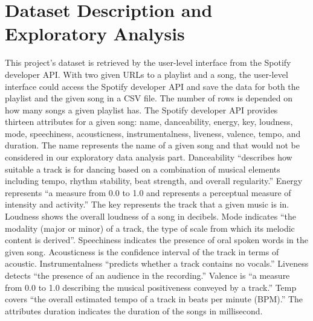 \documentclass[titlepage]{article}
\begin{document}
\section{Dataset Description and Exploratory Analysis}
This project’s dataset is retrieved by the user-level interface from the Spotify developer API. With two given URLs to a playlist and a song, the user-level interface could access the Spotify developer API and save the data for both the playlist and the given song in a CSV file. The number of rows is depended on how many songs a given playlist has. The Spotify developer API provides thirteen attributes for a given song: name, danceability, energy, key, loudness, mode, speechiness, acousticness, instrumentalness, liveness, valence, tempo, and duration. The name represents the name of a given song and that would not be considered in our exploratory data analysis part. Danceability “describes how suitable a track is for dancing based on a combination of musical elements including tempo, rhythm stability, beat strength, and overall regularity.” Energy represents “a measure from 0.0 to 1.0 and represents a perceptual measure of intensity and activity.” The key represents the track that a given music is in. Loudness shows the overall loudness of a song in decibels.  Mode indicates “the modality (major or minor) of a track, the type of scale from which its melodic content is derived”. Speechiness indicates the presence of oral spoken words in the given song. Acousticness is the confidence interval of the track in terms of acoustic. Instrumentalness “predicts whether a track contains no vocals.” Liveness detects “the presence of an audience in the recording.” Valence is “a measure from 0.0 to 1.0 describing the musical positiveness conveyed by a track.” Temp covers “the overall estimated tempo of a track in beats per minute (BPM).” The attributes duration indicates the duration of the songs in millisecond. 
\end{document}
